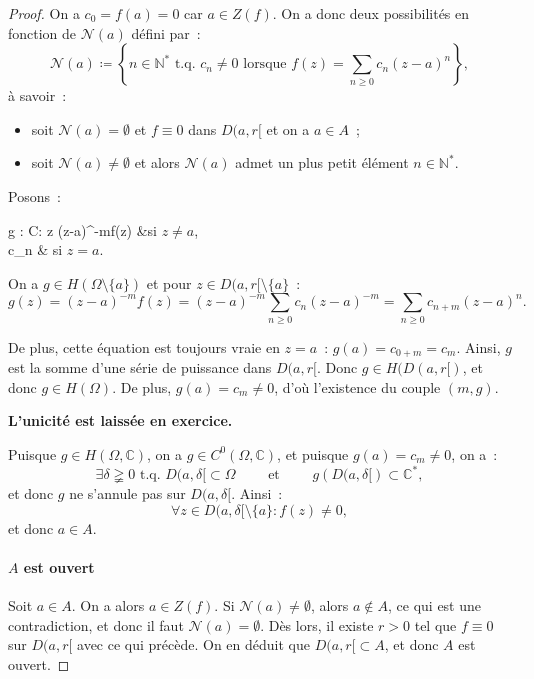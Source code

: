 \documentclass{report}
\theoremstyle{definition}
\theoremstyle{remark}
\numberwithin{equation}{section}
\newcommand{\C}{\mathbb C}
\newcommand{\N}{\mathbb N}
\newcommand{\tq}{\text{ t.q. }}
\begin{document}
\begin{proof}
			On a $c_0 = f(a) = 0$ car $a \in Z(f)$. On a donc deux possibilités en fonction de $\mathcal N(a)$ défini par~:
			\begin{equation}
				\mathcal N(a) \coloneqq \left\{n \in \N^* \tq c_n \neq 0 \text{ lorsque } f(z) = \sum_{n \geq 0}c_n(z-a)^n\right\},
			\end{equation}
			à savoir~:
			\begin{itemize}
				\item soit $\mathcal N(a) = \emptyset$ et $f \equiv 0$ dans $D(a, r[$ et on a $a \in A$~;
				\item soit $\mathcal N(a) \neq \emptyset$ et alors $\mathcal N(a)$ admet un plus petit élément $n \in \N^*$.
			\end{itemize}

			Posons~:
			\begin{subnumcases}
				{g : \Omega \to \C : z \mapsto}
					(z-a)^{-m}f(z) &si $z \neq a$, \\
					c_n & si $z = a$.
			\end{subnumcases}

			On a $g \in H(\Omega \setminus \{a\})$ et pour $z \in D(a, r[ \setminus \{a\}$~:
			\begin{equation}
				g(z) = (z-a)^{-m}f(z) = (z-a)^{-m}\sum_{n \geq 0}c_n(z-a)^{-m} = \sum_{n \geq 0}c_{n+m}(z-a)^n.
			\end{equation}

			De plus, cette équation est toujours vraie en $z=a$~: $g(a) = c_{0+m} = c_m$. Ainsi, $g$ est la somme d'une série de puissance dans $D(a, r[$. Donc
			$g \in H(D(a, r[)$, et donc $g \in H(\Omega)$. De plus, $g(a) = c_m \neq 0$, d'où l'existence du couple $(m, g)$.

			\textbf{L'unicité est laissée en exercice.}

			Puisque $g \in H(\Omega, \C)$, on a $g \in C^0(\Omega, \C)$, et puisque $g(a) = c_m \neq 0$, on a~:
			\begin{equation}
				\exists \delta \gneqq 0 \tq D(a, \delta[ \subset \Omega \qquad \text{ et } \qquad g\left(D(a, \delta[\right) \subset \C^*,
			\end{equation}
			et donc $g$ ne s'annule pas sur $D(a, \delta[$. Ainsi~:
			\begin{equation}
				\forall z \in D(a, \delta[ \setminus \{a\} : f(z) \neq 0,
			\end{equation}
			et donc $a \in A$.

			\paragraph{$A$ est ouvert} Soit $a \in A$. On a alors $a \in Z(f)$. Si $\mathcal N(a) \neq \emptyset$, alors $a \not \in A$, ce qui est une contradiction,
			et donc il faut $\mathcal N(a) = \emptyset$. Dès lors, il existe $r > 0$ tel que $f \equiv 0$ sur $D(a, r[$ avec ce qui précède. On en déduit que
			$D(a, r[ \subset A$, et donc $A$ est ouvert.


\end{proof}
\end{document}
